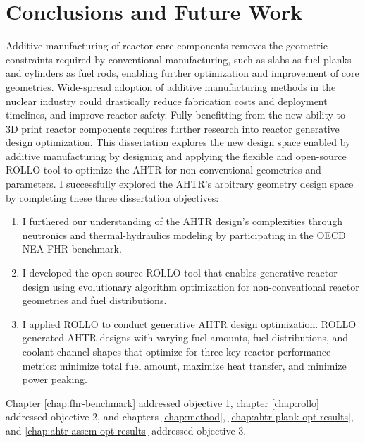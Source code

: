 \chapter{Conclusions and Future Work}
\glsresetall
\label{chap:concl}

Additive manufacturing of reactor core components removes the geometric constraints
required by conventional manufacturing, such as slabs as fuel planks and cylinders 
as fuel rods, enabling further optimization and improvement of core geometries. 
Wide-spread adoption of additive manufacturing methods in the nuclear industry
could drastically reduce fabrication costs and deployment timelines, and improve 
reactor safety. 
Fully benefitting from the new ability to 3D print reactor components requires further 
research into reactor generative design optimization. 
This dissertation explores the new design space enabled by additive manufacturing 
by designing and applying the flexible and open-source \gls{ROLLO} tool to optimize 
the \gls{AHTR} for non-conventional geometries and parameters. 
I successfully explored the \gls{AHTR}'s arbitrary geometry design space by completing 
these three dissertation objectives: 
\begin{enumerate}
    \item I furthered our understanding of the \gls{AHTR} design's complexities 
    through neutronics and thermal-hydraulics modeling by participating in the 
    \gls{OECD} \gls{NEA} \gls{FHR} benchmark.
    \item I developed the open-source \gls{ROLLO} tool that enables generative reactor 
    design using evolutionary algorithm optimization for non-conventional reactor 
    geometries and fuel distributions.
    \item I applied \gls{ROLLO} to conduct generative \gls{AHTR} design optimization.
    \gls{ROLLO} generated \gls{AHTR} designs with varying fuel amounts, fuel 
    distributions, and coolant channel shapes that optimize for three key reactor 
    performance metrics: minimize total fuel amount, maximize heat transfer, and 
    minimize power peaking.
\end{enumerate}
Chapter \ref{chap:fhr-benchmark} addressed objective 1, chapter \ref{chap:rollo} 
addressed objective 2, and chapters \ref{chap:method}, \ref{chap:ahtr-plank-opt-results}, 
and \ref{chap:ahtr-assem-opt-results} addressed objective 3. 

